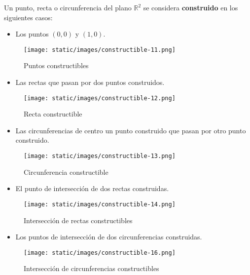 Un punto, recta o circunferencia del plano \(\mathbb R^2\) se considera
\textbf{construido} en los siguientes casos:

\begin{itemize}
\tightlist
\item
  Los puntos \((0,0)\) y \((1,0)\).
\end{itemize}

\begin{figure}
\centering
\texttt{[image: static/images/constructible-11.png]}
\caption{Puntos constructibles}
\end{figure}

\begin{itemize}
\tightlist
\item
  Las rectas que pasan por dos puntos construidos.
\end{itemize}

\begin{figure}
\centering
\texttt{[image: static/images/constructible-12.png]}
\caption{Recta constructible}
\end{figure}

\begin{itemize}
\tightlist
\item
  Las circunferencias de centro un punto construido que pasan por otro
  punto construido.
\end{itemize}

\begin{figure}
\centering
\texttt{[image: static/images/constructible-13.png]}
\caption{Circunferencia constructible}
\end{figure}

\begin{itemize}
\tightlist
\item
  El punto de intersección de dos rectas construidas.
\end{itemize}

\begin{figure}
\centering
\texttt{[image: static/images/constructible-14.png]}
\caption{Intersección de rectas constructibles}
\end{figure}

\begin{itemize}
\tightlist
\item
  Los puntos de intersección de dos circunferencias construidas.
\end{itemize}

\begin{figure}
\centering
\texttt{[image: static/images/constructible-16.png]}
\caption{Intersección de circunferencias constructibles}
\end{figure}

